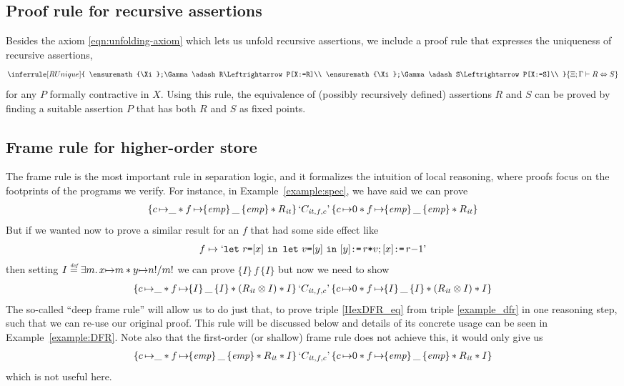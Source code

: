 \documentclass{LMCS}
\theoremstyle{remark}
\newcommand{\QUOTE}[1]{\textnormal{`\ensuremath{#1}'}}
\newcommand{\SYN}[1]{\ensuremath{\texttt{#1}}}
\newcommand{\defeq}{\ensuremath{\stackrel{\mbox{\tiny \it def}}{=}}}
\newcommand{\triple}[3]{{\ensuremath{\!\left.\{ #1 \}\, #2\, \{  #3 \}\!\right.}}}
\newcommand{\pointsto}{\ensuremath{\mapsto}}
\newcommand{\EMP}{\ensuremath{\textit{emp}}}
\newcommand{\X}{\ensuremath{\Xi}}
\begin{document}
\subsection{Proof rule for recursive assertions}\label{subsubsec:runique}
Besides the axiom \eqref{eqn:unfolding-axiom} which lets us unfold recursive assertions, we include a proof rule that expresses the uniqueness of recursive assertions, 
\begin{align*}
\inferrule[RUnique]{
\X;\Gamma\adash R\Leftrightarrow P[X:=R]\\ 
\X;\Gamma\adash  S\Leftrightarrow P[X:=S]\\ 
  }
{ \X;\Gamma\adash R \Leftrightarrow S }
\end{align*}
for any $P$ formally contractive in $X$. 
Using this rule, the equivalence of (possibly recursively defined) assertions $R$ and $S$ can be proved by finding a suitable assertion $P$ that has both $R$ and $S$ as fixed points. 


\subsection{Frame rule for higher-order store} 


The frame rule is the most important rule in separation logic, and it formalizes the intuition of local reasoning, where proofs focus on the footprints of the programs we verify. 
For instance, in Example~\ref{example:spec}, we have said we can prove
\begin{align} \label{example_dfr}
\triple{c\, {\pointsto}\_ * f\,{\pointsto}\triple{\EMP}{\_}{\EMP} * R_{\mathit{it}}}
{\QUOTE{C_{\mathit{it},f,c}}}
{c\,{\pointsto}0 * f\,{\pointsto}\triple{\EMP}{\_}{\EMP} * R_{\mathit{it}}}
\end{align}
But if we wanted now to prove a similar result for an $f$ that had some side effect like
$$f \pointsto \QUOTE{\SYN{let}\ r \SYN{=} [x]  \ \SYN{in let}\ v \SYN{=} [y]\  \SYN{in}\ [y] \SYN{:=}\, r \SYN{*} v; [x] \SYN{:=}\, r{-}1}$$
then setting $I \defeq \exists m.\, x{\pointsto} m * y{\pointsto} n!/m!$ we can prove $\triple{I}{f}{I}$ but now we need to  show
\begin{align}\label{IIexDFR_eq}
\triple{c\, {\pointsto}\_ * f\,{\pointsto}\triple{I}{\_}{I} * (R_{\mathit{it}}\otimes I) * I}
{\QUOTE{C_{\mathit{it},f,c}}}
{c\,{\pointsto}0 * f\,{\pointsto}\triple{I}{\_}{I} * (R_{\mathit{it}} \otimes I)* I}
\end{align}
The so-called ``deep frame rule'' will allow us to  do just that, to prove triple \eqref{IIexDFR_eq} from triple \eqref{example_dfr} in one reasoning step, such that we can re-use our original proof. This rule will be discussed below and details of its concrete usage can be seen in  Example~\ref{example:DFR}.
Note also that the first-order (or shallow) frame rule does not achieve this, it would only give us
\begin{align}\label{shallow}
\triple{c\, {\pointsto}\_ * f\,{\pointsto}\triple{\EMP}{\_}{\EMP} * R_{\mathit{it}} * I}
{\QUOTE{C_{\mathit{it},f,c}}}
{c\,{\pointsto}0 * f\,{\pointsto}\triple{\EMP}{\_}{\EMP} * R_{\mathit{it}} * I}
\end{align}
which is   not useful here.
\end{document}
